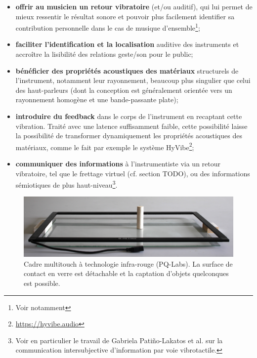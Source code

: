 \begin{itemize}[noitemsep]
	\item \textbf{offrir au musicien un retour vibratoire} (et/ou auditif), qui lui permet de mieux ressentir le résultat sonore et pouvoir plus facilement identifier sa contribution personnelle dans le cas de musique d'ensemble\footnote{Voir notamment };
	\item \textbf{faciliter l'identification et la localisation} auditive des instruments et accroître la lisibilité des relations geste/son pour le public;
	\item \textbf{bénéficier des propriétés acoustiques des matériaux} structurels de l'instrument, notamment leur rayonnement, beaucoup plus singulier que celui des haut-parleurs (dont la conception est généralement orientée vers un rayonnement homogène et une bande-passante plate);
	\item \textbf{introduire du feedback} dans le corps de l'instrument en recaptant cette vibration. Traité avec une latence suffisamment faible, cette possibilité laisse la possibilité de transformer dynamiquement les propriétés acoustiques des matériaux, comme le fait par exemple le système HyVibe\footnote{\url{https://hyvibe.audio}};
	\item \textbf{communiquer des informations} à l'instrumentiste via un retour vibratoire, tel que le frettage virtuel (cf. section TODO), ou des informations sémiotiques de plus haut-niveau\footnote{Voir en particulier le travail de Gabriela Patiño-Lakatos et al. \cite{patino-lakatos_paradigmes_2019} sur la communication intersubjective d'information par voie vibrotactile.}.
\end{itemize}



\begin{figure}[!htbp]
	\captionsetup{format=plain}%
	\includegraphics[width=\textwidth]{gfx/05_interfaces/PQlabs-G4overlay.jpg}
	\caption[Cadre multitouch à technologie infra-rouge]{Cadre multitouch à technologie infra-rouge (PQ-Labs). La surface de contact en verre est détachable et la captation d'objets quelconques est possible.}
	\label{fig:interface:PQlabs-G4overlay}
\end{figure}



